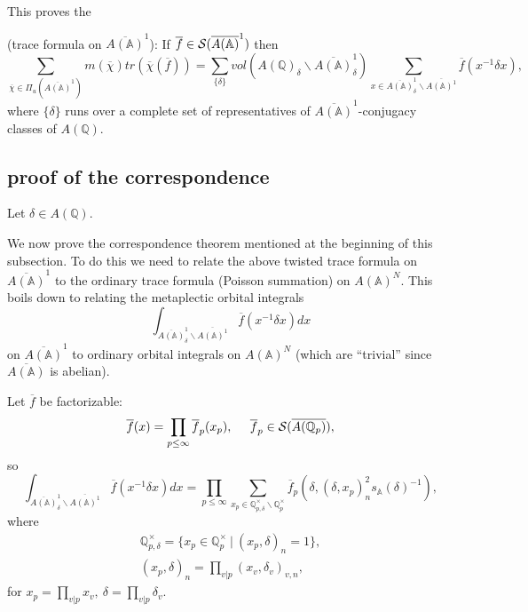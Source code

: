 This proves the

\begin{theorem}
(trace formula on $\overline{A({\mathbb{A}})}^1$):
If $\overline{f}\in {\cal{S}}(\overline{A({\mathbb{A}})}^1)$ then 
\[
\sum_{\overline{\chi }\in \Pi_u (\overline{A({\mathbb{A}})}^1)}
m(\overline{\chi })
tr(\overline{\chi }(\overline{f}))
=\sum_{\{\delta \}}
vol(A({\mathbb{Q}})_\delta \backslash \overline{A({\mathbb{A}})}_\delta ^1)
\sum_{x\in \overline{A({\mathbb{A}})}_\delta ^1
\backslash \overline{A({\mathbb{A}})^1}}
\overline{f}(x^{-1}\delta x),
\]
where $\{\delta \}$ runs over a complete set of representatives of
$\overline{A({\mathbb{A}})}^1$-conjugacy classes of
$A({\mathbb{Q}})$.
\end{theorem}

\subsection{proof of the correspondence}

Let $\delta\in A({\mathbb{Q}})$.

We now prove the correspondence theorem mentioned at the beginning of this
subsection. To do this we need to relate the above twisted trace
formula on $\overline{A({\mathbb{A}})}^1$ to the ordinary trace
formula (Poisson summation) on $A({\mathbb{A}})^N$. This boils down to
relating the metaplectic orbital integrals 
\[
\int_{\overline{A({\mathbb{A}})}_\delta ^1
\backslash \overline{A({\mathbb{A}})^1}}
\overline{f}(x^{-1}\delta x)dx
\]
on $\overline{A({\mathbb{A}})}^1$ to ordinary orbital integrals
on $A({\mathbb{A}})^N$ (which are ``trivial'' since
$\overline{A({\mathbb{A}})}$ is abelian).

Let $\overline{f}$ be factorizable: 
\[
\overline{f}(x)=\prod_{p\leq \infty}\overline{f}_p(x_p),
\;\;\;\;\;\overline{f}_p\in {\cal{S}}(\overline{A({\mathbb{Q}}_p)}),
\]
so 
\begin{equation}
\int_{\overline{A({\mathbb{A}})}_\delta ^1
\backslash \overline{A({\mathbb{A}})^1}}
\overline{f}(x^{-1}\delta x)dx
=\prod_{p\leq \infty}
\sum_{x_p\in {\mathbb{Q}}_{p,\delta}^\times
\backslash {\mathbb{Q}}_p^\times}
\overline{f}_p(\delta ,(\delta,x_p)_n^2s_{\mathbb{A}}(\delta)^{-1} ),
\end{equation}
where
\[
\begin{array}{c}
{\mathbb{Q}}_{p,\delta}^\times
=\{x_p\in {\mathbb{Q}}_p^\times
\ |\ (x_p,\delta )_n=1\},\\
(x_p,\delta)_n=\prod_{v|p}(x_v,\delta_v)_{v,n},
\end{array}
\]
for $x_p=\prod_{v|p}x_v,\ \delta=\prod_{v|p}\delta_v$.
 
